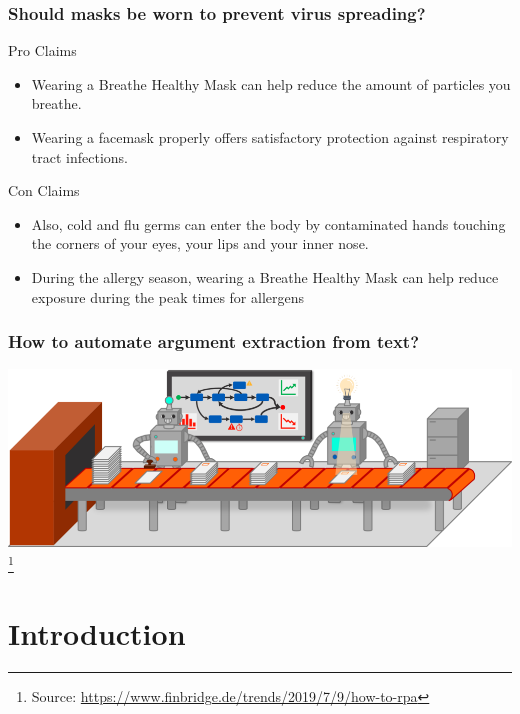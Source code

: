 \documentclass{beamer}
\begin{document}
\begin{frame}
\frametitle{Should masks be worn to prevent virus spreading?}
\begin{block}{Pro Claims}
\begin{itemize}
	\item Wearing a Breathe Healthy Mask can help reduce the amount of particles you breathe.
	\item Wearing a facemask properly offers satisfactory protection against respiratory tract infections.
\end{itemize}
\end{block}

\begin{block}{Con Claims}
\begin{itemize}
	\item Also, cold and flu germs can enter the body by contaminated hands touching the corners of your eyes, your lips and your inner nose.
	\item During the allergy season, wearing a Breathe Healthy Mask can help reduce exposure during the peak times for allergens
\end{itemize}
\end{block}

\end{frame}

\begin{frame}
\frametitle{How to automate argument extraction from text?}
\includegraphics[scale=0.3]{assembly_line.png}
\footnote{
\tiny{Source: \url{https://www.finbridge.de/trends/2019/7/9/how-to-rpa}}}
\end{frame}

\section{Introduction}

\end{document}
